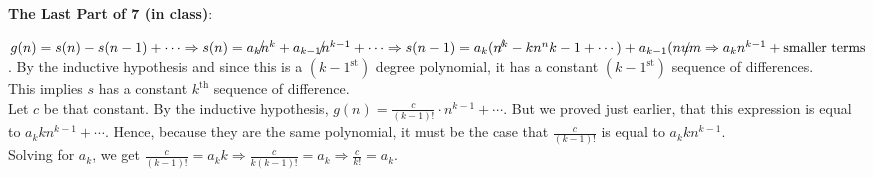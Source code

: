 \documentclass{article}
\begin{document}
\newpage


\textbf{The Last Part of 7 (in class)}:

$g(n) = s(n) - s(n-1) + \cdots \Rightarrow s(n) = \slashed{a_kn^k} + \slashed{a_{k-1}n^{k-1}} + \cdots \Rightarrow s(n-1) = a_k(\slashed{n^k} - kn^n{k-1} + \cdots) + a_{k-1}(\slashed{num} %
\Rightarrow a_kn^{k-1} + \text{smaller terms}$. By the inductive hypothesis and since this is a $(k-1^\text{st})$ degree polynomial, it has a constant $(k-1^\text{st})$ sequence of differences. \\

This implies $s$ has a constant $k^\text{th}$ sequence of difference. \\

Let $c$ be that constant. By the inductive hypothesis, $g(n) = \displaystyle \frac{c}{(k-1)!}\cdot n^{k-1} + \cdots$. But we proved just earlier, that this expression is equal to $a_kkn^{k-1}+\cdots$. Hence, because they are the same polynomial, it must be the case that $\displaystyle \frac{c}{(k-1)!}$ is equal to $a_kkn^{k-1}$. \\

Solving for $a_k$, we get $\displaystyle \frac{c}{(k-1)!} = a_kk \Rightarrow \displaystyle \frac{c}{k(k-1)!} = a_k \Rightarrow \displaystyle \frac{c}{k!} = a_k$. 
\end{document}
